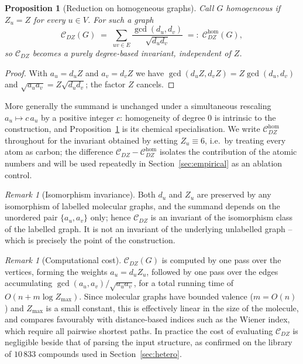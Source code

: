 \documentclass[11pt,a4paper]{article}
\theoremstyle{plain}
\newtheorem{proposition}[theorem]{Proposition}
\theoremstyle{definition}
\theoremstyle{remark}
\newtheorem{remark}[theorem]{Remark}
\newcommand{\CDZ}{\mathcal{C}_{DZ}}
\newcommand{\CDZhom}{\mathcal{C}_{DZ}^{\mathrm{hom}}}
\newcommand{\gcdd}{\operatorname{gcd}}
\begin{document}
\begin{proposition}[Reduction on homogeneous graphs]
\label{prop:homog}
Call $G$ \emph{homogeneous} if $Z_u=Z$ for every $u\in V$. For such a graph
\[
  \CDZ(G) \;=\; \sum_{uv\in E}\frac{\gcdd(d_u,d_v)}{\sqrt{d_ud_v}}
  \;=:\; \CDZhom(G),
\]
so $\CDZ$ becomes a purely degree-based invariant, independent of $Z$.
\end{proposition}

\begin{proof}
With $a_u=d_uZ$ and $a_v=d_vZ$ we have $\gcdd(d_uZ,d_vZ)=Z\gcdd(d_u,d_v)$ and
$\sqrt{a_ua_v}=Z\sqrt{d_ud_v}$; the factor $Z$ cancels.
\end{proof}

More generally the summand is unchanged under a simultaneous rescaling
$a_u\mapsto c\,a_u$ by a positive integer $c$: homogeneity of degree $0$ is
intrinsic to the construction, and Proposition~\ref{prop:homog} is its chemical
specialisation. We write $\CDZhom$ throughout for the invariant obtained by
setting $Z_u\equiv6$, i.e.\ by treating every atom as carbon; the difference
$\CDZ-\CDZhom$ isolates the contribution of the atomic numbers and will be used
repeatedly in Section~\ref{sec:empirical} as an ablation control.

\begin{remark}[Isomorphism invariance]
\label{rem:isom}
Both $d_u$ and $Z_u$ are preserved by any isomorphism of labelled molecular
graphs, and the summand depends on the unordered pair $\{a_u,a_v\}$ only; hence
$\CDZ$ is an invariant of the isomorphism class of the labelled graph. It is not
an invariant of the underlying unlabelled graph -- which is precisely the point
of the construction.
\end{remark}

\begin{remark}[Computational cost]
\label{rem:cost}
$\CDZ(G)$ is computed by one pass over the vertices, forming the weights
$a_u=d_uZ_u$, followed by one pass over the edges accumulating
$\gcdd(a_u,a_v)/\sqrt{a_ua_v}$, for a total running time of
$O(n+m\log Z_{\max})$. Since molecular graphs have bounded valence ($m=O(n)$)
and $Z_{\max}$ is a small constant, this is effectively linear in the size of
the molecule, and compares favourably with distance-based indices such as the
Wiener index, which require all pairwise shortest paths. In practice the cost of
evaluating $\CDZ$ is negligible beside that of parsing the input structure, as
confirmed on the library of $10\,833$ compounds used in
Section~\ref{sec:hetero}.
\end{remark}
\end{document}
